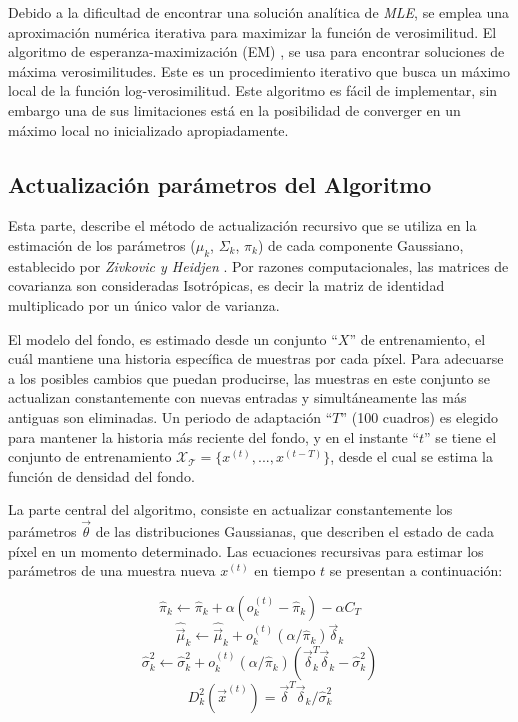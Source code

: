  
Debido a la dificultad de encontrar una solución analítica de \textit{MLE}, se emplea una aproximación numérica iterativa para maximizar la función de verosimilitud.  El algoritmo de esperanza-maximización (EM) \cite{dempster_maximum_1977}, se usa para encontrar soluciones de máxima verosimilitudes. Este es un procedimiento iterativo que busca un máximo local de la función log-verosimilitud. Este algoritmo es fácil de implementar, sin embargo una de sus limitaciones está en la posibilidad de converger en un máximo local no inicializado apropiadamente.


\subsection{Actualización parámetros del Algoritmo}

Esta parte, describe el método de actualización recursivo que se utiliza en la estimación de los parámetros ($\mu_k$, $\Sigma_k$, $\pi_k$) de cada componente Gaussiano, establecido por \textit{Zivkovic y Heidjen} \cite{zivkovic_efficient_2006}. Por razones computacionales, las matrices de covarianza son consideradas Isotrópicas, es decir la matriz de identidad multiplicado por un único valor de varianza.

El modelo del fondo, es estimado desde un conjunto ``$X$'' de entrenamiento, el cuál mantiene una historia específica de muestras por cada píxel. Para adecuarse a los posibles cambios que puedan producirse, las muestras en este conjunto se actualizan constantemente con nuevas entradas y simultáneamente las más antiguas son eliminadas. Un periodo de adaptación ``$T$'' (100 cuadros) es elegido para mantener la historia más reciente del fondo, y en el instante ``$t$'' se tiene el conjunto de entrenamiento $\mathcal{X_T} = \{x^{(t)}, ..., x^{(t-T)}\}$, desde el cual se estima la función de densidad del fondo.

La parte central del algoritmo, consiste en actualizar constantemente los parámetros $\vec{\theta}$ de las distribuciones Gaussianas, que describen el estado de cada píxel en un momento determinado. Las ecuaciones recursivas para estimar los parámetros de una muestra nueva $x^{(t)}$ en tiempo $t$ se presentan a continuación:


\begin{equation} \label{eq:mixturefactor_update}
\hat{\pi}_k \leftarrow  \hat{\pi}_k + \alpha(o^{(t)}_k - \hat{\pi}_k) - \alpha C_T
\end{equation}
\begin{equation} \label{eq:mixturemu_update}
\hat{\vec{\mu}}_k \leftarrow \hat{\vec{\mu}}_k + o^{(t)}_k (\alpha/\hat{\pi}_k) \vec{\delta}_k
\end{equation}
\begin{equation} \label{eq:mixturesigma_update}
\hat{\sigma}^2_k \leftarrow \hat{\sigma}^2_k + o^{(t)}_k (\alpha/\hat{\pi}_k) (\vec{\delta}^T_k \vec{\delta}_k - \hat{\sigma}^2_k)
\end{equation}
\begin{equation} \label{eq:mahalanobis_distance}
D^{2}_{k}(\vec{x}^{(t)})=\vec{\delta}^T\vec{\delta}_k/\hat{\sigma}^{2}_k
\end{equation}

